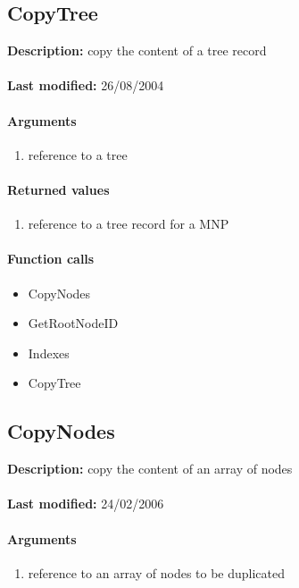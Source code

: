 \subsection{CopyTree}
\textbf{Description:} copy the content of a tree record\\
\\\textbf{Last modified:} 26/08/2004

\paragraph{Arguments}
\begin{enumerate}
\item reference to a tree
\end{enumerate}

\paragraph{Returned values}
\begin{enumerate}
\item reference to a tree record for a MNP
\end{enumerate}

\paragraph{Function calls}
\begin{itemize}
\item CopyNodes
\item GetRootNodeID
\item Indexes
\item CopyTree
\end{itemize}

\subsection{CopyNodes}
\textbf{Description:} copy the content of an array of nodes\\
\\\textbf{Last modified:} 24/02/2006

\paragraph{Arguments}
\begin{enumerate}
\item reference to an array of nodes to be duplicated
\end{enumerate}

